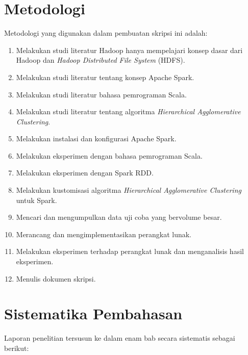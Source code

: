 \section{Metodologi}
\label{sec:metlit}
Metodologi yang digunakan dalam pembuatan skripsi ini adalah:
\begin{enumerate}

\item Melakukan studi literatur Hadoop hanya mempelajari konsep dasar dari Hadoop dan \textit{Hadoop Distributed File System} (HDFS).

\item Melakukan studi literatur tentang konsep Apache Spark.

\item Melakukan studi literatur bahasa pemrograman Scala.

\item Melakukan studi literatur tentang algoritma {\it Hierarchical Agglomerative Clustering}.

\item Melakukan instalasi dan konfigurasi Apache Spark.

\item Melakukan eksperimen dengan bahasa pemrograman Scala.

\item Melakukan eksperimen dengan Spark RDD.

\item Melakukan kustomisasi algoritma {\it Hierarchical Agglomerative Clustering} untuk Spark.

\item Mencari dan mengumpulkan data uji coba yang bervolume besar.

\item Merancang dan mengimplementasikan perangkat lunak.

\item Melakukan eksperimen terhadap perangkat lunak dan menganalisis hasil eksperimen.

\item Menulis dokumen skripsi.




\end{enumerate}

\section{Sistematika Pembahasan}
\label{sec:sispem}

Laporan penelitian tersusun ke dalam enam bab secara sistematis sebagai berikut:


